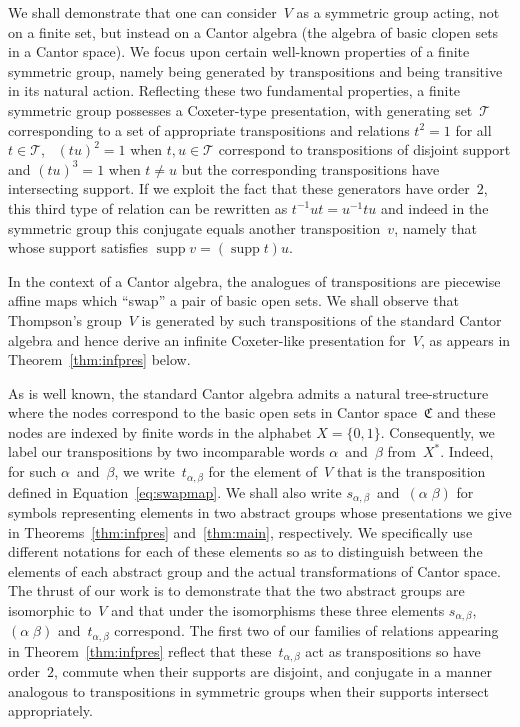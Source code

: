 \documentclass[a4paper,11pt]{article}
\numberwithin{equation}{section}
\newcommand{\C}{\mathfrak{C}}
\newcommand{\swap}[2]{(#1\;#2)}
\newcommand{\supp}{\operatorname{supp}}
\begin{document}
We shall demonstrate that one can consider~$V$ as a symmetric group
acting, not on a finite set, but instead on a Cantor algebra (the
algebra of basic clopen sets in a Cantor space).  We focus upon
certain well-known properties of a finite symmetric group, namely
being generated by transpositions and being transitive in its natural
action.  Reflecting these two fundamental properties, a finite
symmetric group possesses a Coxeter-type presentation, with generating
set~$\mathcal{T}$ corresponding to a set of appropriate transpositions
and relations $t^{2} = 1$ for all $t \in \mathcal{T}$, \ $(tu)^{2} =
1$ when $t,u \in \mathcal{T}$ correspond to transpositions of disjoint
support and $(tu)^{3} = 1$ when $t \neq u$ but the corresponding
transpositions have intersecting support.  If we exploit the fact that
these generators have order~$2$, this third type of relation can be
rewritten as $t^{-1}ut = u^{-1}tu$ and indeed in the symmetric group
this conjugate equals another transposition~$v$, namely that whose
support satisfies $\supp v = (\supp t)u$.

In the context of a Cantor algebra, the analogues of transpositions
are piecewise affine maps which ``swap'' a pair of basic open sets.
We shall observe that Thompson's group~$V$ is generated by such
transpositions of the standard Cantor algebra and hence derive an
infinite Coxeter-like presentation for~$V$, as appears in
Theorem~\ref{thm:infpres} below.

As is well known, the standard Cantor algebra admits a natural
tree-structure where the nodes correspond to the basic open sets in
Cantor space~$\C$ and these nodes are indexed by finite words in the
alphabet $X = \{0,1\}$. Consequently, we label our transpositions by
two incomparable words $\alpha$~and~$\beta$ from~$X^{\ast}$.  Indeed,
for such $\alpha$~and~$\beta$, we write~$t_{\alpha,\beta}$ for the
element of~$V$ that is the transposition defined in
Equation~\eqref{eq:swapmap}.  We shall also write
$s_{\alpha,\beta}$~and~$\swap{\alpha}{\beta}$ for symbols representing
elements in two abstract groups whose presentations we give in
Theorems~\ref{thm:infpres} and~\ref{thm:main}, respectively.  We
specifically use different notations for each of these elements so as
to distinguish between the elements of each abstract group and the
actual transformations of Cantor space.  The thrust of our work is to
demonstrate that the two abstract groups are isomorphic to~$V$ and
that under the isomorphisms these three elements
$s_{\alpha,\beta}$,~$\swap{\alpha}{\beta}$ and~$t_{\alpha,\beta}$
correspond.  The first two of our families of relations appearing in
Theorem~\ref{thm:infpres} reflect that these~$t_{\alpha,\beta}$ act as
transpositions so have order~$2$, commute when their supports are
disjoint, and conjugate in a manner analogous to transpositions in
symmetric groups when their supports intersect appropriately.
\end{document}
